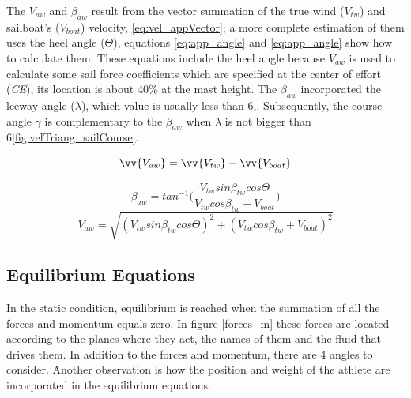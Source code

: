 

The $V_{aw}$ and $\beta_{aw}$ result from the vector summation of the true wind ($V_{tw}$) and sailboat's ($V_{boat}$) velocity, \ref{eq:vel_appVector}; a more complete estimation of them uses the heel angle ($\Theta$), equations \ref{eq:app_angle} and \ref{eq:app_angle} show how to calculate them. These equations include the heel angle because $V_{aw}$ is used to calculate some sail force coefficients which are specified at the center of effort (\textit{CE}), its location is about 40\% at the mast height. The $\beta_{aw}$ incorporated the leeway angle ($\lambda$), which value is usually less than 6\degree \cite{philpott1993yacht},\cite{claughton1998sailing}. Subsequently, the course angle $\gamma$ is complementary to the $\beta_{aw}$ when $\lambda$ is not bigger than 6\degree \ref{fig:velTriang_sailCourse}. \par
\begin{equation}\label{eq:vel_appVector}
    \vv{V_{aw}}=\vv{V_{tw}}-\vv{V_{boat}}
\end{equation}

\begin{equation} \label{eq:app_angle}
    \beta_{aw}=tan^{-1} \bigg( \frac{ V_{tw} sin \beta_{tw} cos \Theta }{ V_{tw} cos \beta_{tw} + V_{boat}} \bigg)
\end{equation}
\newline
\begin{equation} \label{eq:ap_vel}
    V_{aw}=  \sqrt{ (V_{tw} sin \beta_{tw} cos \Theta)^2 + (V_{tw} cos \beta_{tw} + V_{boat})^2}
\end{equation}

\subsection {Equilibrium Equations} \label{sec:equil_equat}
In the static condition, equilibrium is reached when the summation of all the forces and momentum equals zero. In figure \ref{forces_m} these forces are located according to the planes where they act, the names of them and the fluid that drives them. In addition to the forces and momentum, there are 4 angles to consider. Another observation is how the position and weight of the athlete are incorporated in the equilibrium equations. \par 

